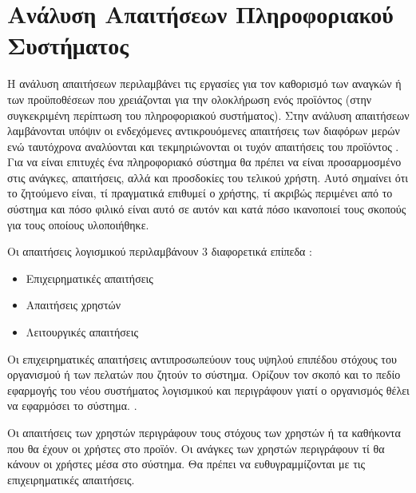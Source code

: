 \documentclass{assignment}
\begin{document}


\section{Ανάλυση Απαιτήσεων Πληροφοριακού Συστήματος}

Η ανάλυση απαιτήσεων περιλαμβάνει τις εργασίες για τον καθορισμό των αναγκών ή των προϋποθέσεων που χρειάζονται για την ολοκλήρωση ενός προϊόντος (στην συγκεκριμένη περίπτωση του πληροφοριακού συστήματος). Στην ανάλυση απαιτήσεων λαμβάνονται υπόψιν οι ενδεχόμενες αντικρουόμενες απαιτήσεις των διαφόρων μερών ενώ ταυτόχρονα αναλύονται και τεκμηριώνονται οι τυχόν απαιτήσεις του προϊόντος \cite{wiki:requirement_analysis}. Για να είναι επιτυχές ένα πληροφοριακό σύστημα θα πρέπει να είναι προσαρμοσμένο στις ανάγκες, απαιτήσεις, αλλά και προσδοκίες του τελικού χρήστη. Αυτό σημαίνει ότι το ζητούμενο είναι, τί πραγματικά επιθυμεί ο χρήστης, τί ακριβώς περιμένει από το σύστημα και πόσο φιλικό είναι αυτό σε αυτόν και κατά πόσο ικανοποιεί τους σκοπούς για τους οποίους υλοποιήθηκε.  

Οι απαιτήσεις λογισμικού περιλαμβάνουν 3 διαφορετικά επίπεδα \cite{triadis}:

\begin{itemize}
\item Επιχειρηματικές απαιτήσεις
\item Απαιτήσεις χρηστών
\item Λειτουργικές απαιτήσεις
\end{itemize}

Οι επιχειρηματικές απαιτήσεις αντιπροσωπεύουν τους υψηλού επιπέδου στόχους του οργανισμού ή των πελατών που ζητούν το σύστημα. Ορίζουν τον σκοπό και το πεδίο εφαρμογής του νέου συστήματος λογισμικού και περιγράφουν γιατί ο οργανισμός θέλει να εφαρμόσει το σύστημα.  \cite{triadis}.

Οι απαιτήσεις των χρηστών περιγράφουν τους στόχους των χρηστών ή τα καθήκοντα που θα έχουν οι χρήστες στο προϊόν. Οι ανάγκες των χρηστών περιγράφουν τί θα κάνουν οι χρήστες μέσα στο σύστημα. Θα πρέπει να ευθυγραμμίζονται με τις επιχειρηματικές απαιτήσεις. \cite{triadis}
\end{document}
